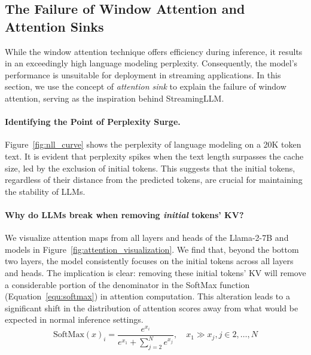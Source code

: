 \documentclass{article} \usepackage{iclr2024_conference,times}
\def\method{StreamingLLM\xspace}
\newcommand{\myparagraph}[1]{\vspace{0pt}\paragraph{#1}}
\begin{document}
\subsection{The Failure of Window Attention and Attention Sinks}
While the window attention technique offers efficiency during inference, it results in an exceedingly high language modeling perplexity. Consequently, the model's performance is unsuitable for deployment in streaming applications. In this section, we use the concept of \emph{attention sink} to explain the failure of window attention, serving as the inspiration behind \method.
\vspace{-1em}
\myparagraph{Identifying the Point of Perplexity Surge.} 
Figure~\ref{fig:nll_curve} shows the perplexity of language modeling on a 20K token text. It is evident that perplexity spikes when the text length surpasses the cache size, led by the exclusion of initial tokens. This suggests that the initial tokens, regardless of their distance from the predicted tokens, are crucial for maintaining the stability of LLMs.
\vspace{-0.5em}
\myparagraph{Why do LLMs break when removing \emph{initial} tokens' KV?} 
We visualize attention maps from all layers and heads of the Llama-2-7B and models in Figure~\ref{fig:attention_visualization}. We find that, beyond the bottom two layers, the model consistently focuses on the initial tokens across all layers and heads. The implication is clear: removing these initial tokens' KV will remove a considerable portion of the denominator in the SoftMax function (Equation~\ref{equ:softmax}) in attention computation. This alteration leads to a significant shift in the distribution of attention scores away from what would be expected in normal inference settings.
\vspace{-1em}
\begin{equation}
    \text{SoftMax}(x)_i = \frac{e^{x_i}}{e^{x_1} + \sum_{j=2}^{N} e^{x_j}}, \quad x_1 \gg x_j, j \in 2, \dots, N
    \label{equ:softmax}
\end{equation}
\vspace{-1em}
\end{document}
